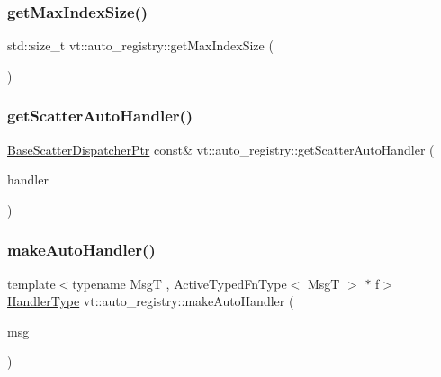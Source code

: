 \mbox{\label{namespacevt_1_1auto__registry_a590741e9077c758629426d70ea37f4bf}} 
\subsubsection{\texorpdfstring{get\+Max\+Index\+Size()}{getMaxIndexSize()}}
{\footnotesize\ttfamily std\+::size\+\_\+t vt\+::auto\+\_\+registry\+::get\+Max\+Index\+Size (\begin{DoxyParamCaption}{ }\end{DoxyParamCaption})\hspace{0.3cm}{\ttfamily [inline]}}

\mbox{\label{namespacevt_1_1auto__registry_abbf75aeffaf0835ce13b2b34502fc2cb}} 
\subsubsection{\texorpdfstring{get\+Scatter\+Auto\+Handler()}{getScatterAutoHandler()}}
{\footnotesize\ttfamily \hyperlink{namespacevt_1_1auto__registry_aba7be4c573c0f1361c024e4d3293a62a}{Base\+Scatter\+Dispatcher\+Ptr} const\& vt\+::auto\+\_\+registry\+::get\+Scatter\+Auto\+Handler (\begin{DoxyParamCaption}\item[{\hyperlink{namespacevt_af64846b57dfcaf104da3ef6967917573}{Handler\+Type} const}]{handler }\end{DoxyParamCaption})\hspace{0.3cm}{\ttfamily [inline]}}

\mbox{\label{namespacevt_1_1auto__registry_abac49a5da9edd265913ca474a6624a09}} 
\subsubsection{\texorpdfstring{make\+Auto\+Handler()}{makeAutoHandler()}\hspace{0.1cm}{\footnotesize\ttfamily [1/2]}}
{\footnotesize\ttfamily template$<$typename MsgT , Active\+Typed\+Fn\+Type$<$ Msg\+T $>$ $\ast$ f$>$ \\
\hyperlink{namespacevt_af64846b57dfcaf104da3ef6967917573}{Handler\+Type} vt\+::auto\+\_\+registry\+::make\+Auto\+Handler (\begin{DoxyParamCaption}\item[{MsgT $\ast$const}]{msg }\end{DoxyParamCaption})}

